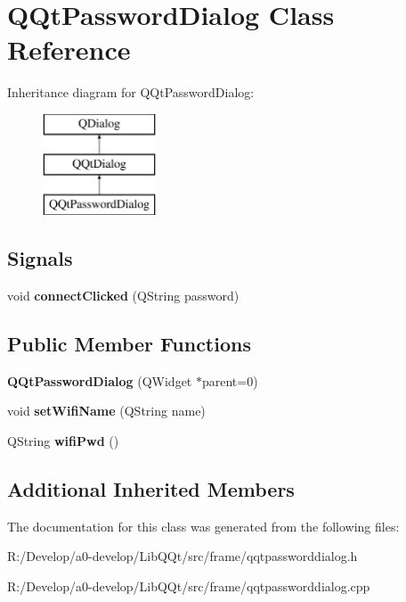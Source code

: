 \hypertarget{class_q_qt_password_dialog}{}\section{Q\+Qt\+Password\+Dialog Class Reference}
\label{class_q_qt_password_dialog}
Inheritance diagram for Q\+Qt\+Password\+Dialog\+:\begin{figure}[H]
\begin{center}
\leavevmode
\includegraphics[height=3.000000cm]{class_q_qt_password_dialog}
\end{center}
\end{figure}
\subsection*{Signals}
\begin{DoxyCompactItemize}
\item 
\mbox{\label{class_q_qt_password_dialog_af3cd29d432d4469c88e9ac5bf02108fb}} 
void {\bfseries connect\+Clicked} (Q\+String password)
\end{DoxyCompactItemize}
\subsection*{Public Member Functions}
\begin{DoxyCompactItemize}
\item 
\mbox{\label{class_q_qt_password_dialog_a9b1666ebe236701aee1339dab952e2d6}} 
{\bfseries Q\+Qt\+Password\+Dialog} (Q\+Widget $\ast$parent=0)
\item 
\mbox{\label{class_q_qt_password_dialog_ab1248d66f42abea338a0a5019077f506}} 
void {\bfseries set\+Wifi\+Name} (Q\+String name)
\item 
\mbox{\label{class_q_qt_password_dialog_a02e4f7f4f56cfb6beea005c0fb49991e}} 
Q\+String {\bfseries wifi\+Pwd} ()
\end{DoxyCompactItemize}
\subsection*{Additional Inherited Members}


The documentation for this class was generated from the following files\+:\begin{DoxyCompactItemize}
\item 
R\+:/\+Develop/a0-\/develop/\+Lib\+Q\+Qt/src/frame/qqtpassworddialog.\+h\item 
R\+:/\+Develop/a0-\/develop/\+Lib\+Q\+Qt/src/frame/qqtpassworddialog.\+cpp\end{DoxyCompactItemize}
